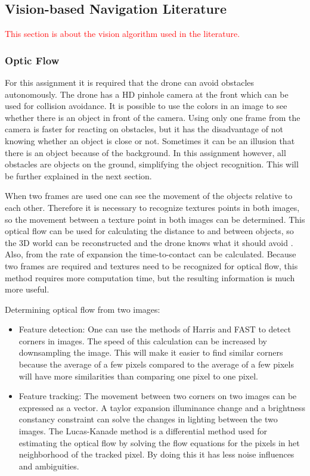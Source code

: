 \subsection{Vision-based Navigation Literature}
\label{subsec:lit_vision}
\textcolor{red}{This section is about the vision algorithm used in the literature.}

\subsubsection{Optic Flow}

For this assignment it is required that the drone can avoid obstacles autonomously. The drone has a HD pinhole camera at the front which can be used for collision avoidance. It is possible to use the colors in an image to see whether there is an object in front of the camera. Using only one frame from the camera is faster for reacting on obstacles, but it has the disadvantage of not knowing whether an object is close or not. Sometimes it can be an illusion that there is an object because of the background. In this assignment however, all obstacles are objects on the ground, simplifying the object recognition. This will be further explained in the next section.

When two frames are used one can see the movement of the objects relative to each other. Therefore it is necessary to recognize textures points in both images, so the movement between a texture point in both images can be determined. This optical flow can be used for calculating the distance to and between objects, so the 3D world can be reconstructed and the drone knows what it should avoid \cite{Gibson}. Also, from the rate of expansion the time-to-contact can be calculated. Because two frames are required and textures need to be recognized for optical flow, this method requires more computation time, but the resulting information is much more useful.

Determining optical flow from two images:
\begin{itemize}
\item Feature detection: One can use the methods of Harris and FAST to detect corners in images. The speed of this calculation can be increased by downsampling the image. This will make it easier to find similar corners  because the average of a few pixels compared to the average of a few pixels will have more similarities than comparing one pixel to one pixel.
\item Feature tracking: The movement between two corners on two images can be expressed as a vector. A taylor expansion illuminance change and a brightness constancy constraint   can solve the changes in lighting between the two images. The Lucas-Kanade method is a differential method used for estimating the optical flow by solving the flow equations for the pixels in het neighborhood of the tracked pixel. By doing this it has less noise influences and ambiguities.
\end{itemize}

